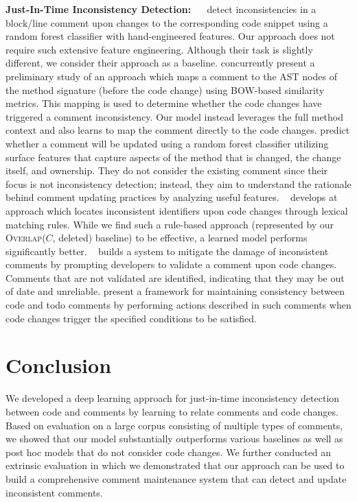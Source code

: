 \documentclass[letterpaper]{article} %
\newcommand{\Comment}{$C$}
\newcommand{\Posthoc}{post hoc}
\newcommand{\JustInTime}{just-in-time}
\newcommand{\HasOverlap}{\textsc{Overlap}}
\newcommand{\DeletedCode}{deleted}
\begin{document}
\noindent\textbf{Just-In-Time Inconsistency Detection:}
~\citeauthor{LiuOutdatedLine}~ detect inconsistencies in a block/line comment upon changes to the corresponding code snippet using a random forest classifier with hand-engineered features. Our approach does not require such extensive feature engineering. Although their task is slightly different, we consider their approach as a baseline.
\citet{StulovaTowards} concurrently present a preliminary study of an approach which maps a comment to the AST nodes of the method signature (before the code change) using BOW-based similarity metrics. This mapping is used to determine whether the code changes have triggered a comment inconsistency. Our model instead leverages the full method context and also learns to map the comment directly to the code changes. \citet{Malik08} predict whether a comment will be updated using a random forest classifier utilizing surface features that capture aspects of the method that is changed, the change itself, and ownership. They do not consider the existing comment since their focus is not inconsistency detection; instead, they aim to understand the rationale behind comment updating practices by analyzing useful features. ~\citet{SaduThesis} develops at approach which locates inconsistent identifiers upon code changes through lexical matching rules. While we find such a rule-based approach (represented by our \HasOverlap{}(\Comment{}, \DeletedCode{}) baseline) to be effective, a learned model performs significantly better. ~\citet{Svensson2015ReducingOA} builds a system to mitigate the damage of inconsistent comments by prompting developers to validate a comment upon code changes. Comments that are not validated are identified, indicating that they may be out of date and unreliable. \citet{NieTrigit} present a framework for maintaining consistency between code and todo comments by performing actions described in such comments when code changes trigger the specified conditions to be satisfied.



\section{Conclusion}
We developed a deep learning approach for \JustInTime{} inconsistency detection between code and comments by learning to relate comments and code changes. Based on evaluation on a large corpus consisting of multiple types of comments, we showed that our model substantially  outperforms various baselines as well as \Posthoc{} models that do not consider code changes. We further conducted an extrinsic evaluation in which we demonstrated that our approach can be used to build a comprehensive comment maintenance system that can detect and update inconsistent comments.
\end{document}
